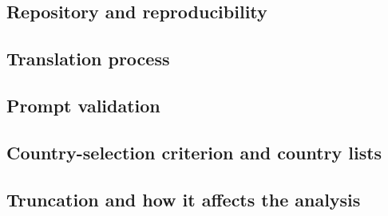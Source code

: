 \documentclass{article}
\begin{document}
\subsection{Repository and reproducibility}
\label{sec:item10}

\subsection{Translation process}
\label{sec:itemA2}

\subsection{Prompt validation}
\label{sec:itemA6}

\subsection{Country-selection criterion and country lists}
\label{sec:itemA9}

\subsection{Truncation and how it affects the analysis}
\label{sec:itemA13}
\end{document}

